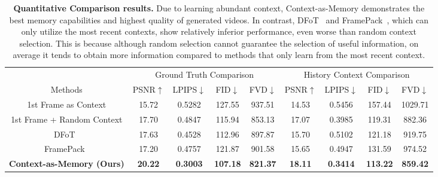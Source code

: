\begin{table}[t]

\tabcolsep=0.09cm
\center
\begin{tabular}{c | c c c c | c c c c }
\toprule
& \multicolumn{4}{c}{Ground Truth Comparison} & \multicolumn{4}{c}{History Context Comparison} \\
  Methods  & PSNR$\uparrow$ & LPIPS$\downarrow$ & FID$\downarrow$ & FVD$\downarrow$ & PSNR$\uparrow$ & LPIPS$\downarrow$ & FID$\downarrow$ & FVD$\downarrow$ \\
  \hline
  \hline
  1st Frame as Context & 15.72 & 0.5282 &  127.55 & 937.51 & 14.53 & 0.5456 &  157.44 & 1029.71 \\
  1st Frame + Random Context & 17.70 & 0.4847 &  115.94 & 853.13 & 17.07 & 0.3985 &  119.31 & 882.36 \\
  DFoT~\cite{dfot} & 17.63 & 0.4528 &  112.96 & 897.87 & 15.70 & 0.5102 &  121.18 & 919.75 \\
  FramePack~\cite{framepack} & 17.20 & 0.4757 &  121.87 & 901.58 & 15.65 & 0.4947 &  131.59 & 974.52 \\
  \textbf{Context-as-Memory (Ours)} & \textbf{20.22} & \textbf{0.3003} &  \textbf{107.18} & \textbf{821.37} & \textbf{18.11} & \textbf{0.3414} &  \textbf{113.22} & \textbf{859.42} \\
  
\bottomrule

\end{tabular}
\caption{
\textbf{Quantitative Comparison results.} Due to learning abundant context, Context-as-Memory demonstrates the best memory capabilities and highest quality of generated videos. In contrast, DFoT~\cite{dfot} and FramePack~\cite{framepack}, which can only utilize the most recent contexts, show relatively inferior performance, even worse than random context selection. This is because although random selection cannot guarantee the selection of useful information, on average it tends to obtain more information compared to methods that only learn from the most recent context.
}
\vspace{-0.6cm}
\label{table:comp}
\end{table}